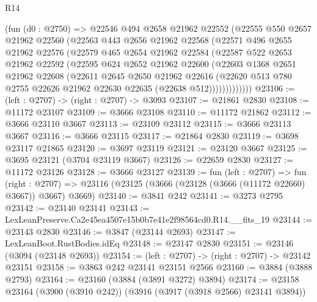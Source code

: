 \begin{lexlean}{R14}
\begin{coremodule}
        (fun (d0 : @2750) =>
        @22546
          @494
          @2658
          @21962
          @22552
          (@22555
            @550
            @2657
            @21962
            @22560
            (@22563
              @443
              @2656
              @21962
              @22568
              (@22571
                @496
                @2655
                @21962
                @22576
                (@22579
                  @465
                  @2654
                  @21962
                  @22584
                  (@22587
                    @522
                    @2653
                    @21962
                    @22592
                    (@22595
                      @624
                      @2652
                      @21962
                      @22600
                      (@22603
                        @1368
                        @2651
                        @21962
                        @22608
                        (@22611
                          @2645
                          @2650
                          @21962
                          @22616
                          (@22620
                            @513
                            @780
                            @2755
                            @22626
                            @21962
                            @22630
                            @22635
                            (@22638 @512)))))))))))))
@23106 := (left : @2707) -> (right : @2707) -> @3093
@23107 := @21861 @2830
@23108 := @11172 @23107
@23109 := @3666 @23108
@23110 := @11172 @21862
@23112 := @3666 @23110 @3667
@23113 := @23109 @23112
@23115 := @3666 @23113 @3667
@23116 := @3666 @23115
@23117 := @21864 @2830
@23119 := @3698 @23117 @21865
@23120 := @3697 @23119
@23121 := @23120 @3667
@23125 := @3695 @23121 (@3704 @23119 @3667)
@23126 := @22659 @2830
@23127 := @11172 @23126
@23128 := @3666 @23127
@23139 := fun (left : @2707) =>
  fun (right : @2707) => @23116 (@23125 (@3666 (@23128 (@3666 (@11172 @22660) @3667)) @3667) @3669)
@23140 := @3841 @242
@23141 := @3273 @2795
@23142 := @23140 @23141
@23143 := LexLeanPreserve.Ca2e45ea4507e15b0b7e41e2f98564cd0.R14.__fits_19
@23144 := @23143 @2830
@23146 := @3847 (@23144 @2693)
@23147 := LexLeanBoot.RustBodies.idEq
@23148 := @23147 @2830
@23151 := @23146 (@3094 (@23148 @2693))
@23154 := (left : @2707) -> (right : @2707) -> @23142 @23151
@23158 := @3863 @242 @23141 @23151 @2566
@23160 := @3884 (@3888 @2793)
@23164 := @23160 (@3884 (@3891 @3272) @3894)
@23174 := @23158 @23164 (@3900 (@3910 @242)) (@3916 (@3917 (@3918 @2566) @23141 @3894))

\end{coremodule}
\end{lexlean}
